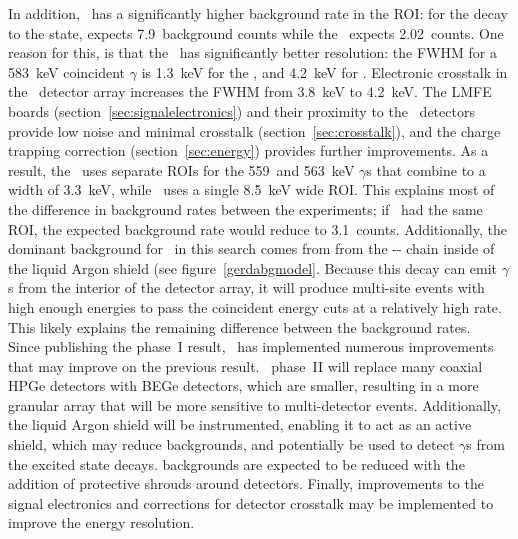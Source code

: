 \documentclass[/main.tex]{subfiles}
\begin{document}
In addition, \Gerda\ has a significantly higher background rate in the ROI: for the decay to the  state, \Gerda expects 7.9~background counts while the \MJD\ expects 2.02~counts.
One reason for this, is that the \MJD\ has significantly better resolution: the FWHM for a  583~keV coincident $\gamma$ is 1.3~keV for the \MJD, and 4.2~keV for \Gerda.
Electronic crosstalk in the \Gerda\ detector array increases the FWHM from 3.8~keV to 4.2~keV.
The LMFE boards (section~\ref{sec:signalelectronics}) and their proximity to the \MJ\ detectors provide low noise and minimal crosstalk (section~\ref{sec:crosstalk}), and the charge trapping correction (section~\ref{sec:energy}) provides further improvements.
As a result, the \MJD\ uses separate ROIs for the 559~and 563~keV $\gamma$s that combine to a width of 3.3~keV, while \Gerda\ uses a single 8.5~keV wide ROI.
This explains most of the difference in background rates between the experiments; if \Gerda\ had the same ROI, the expected background rate would reduce to 3.1~counts.
Additionally, the dominant background for \Gerda\ in this search comes from  from the -- chain inside of the liquid Argon shield (see figure~\ref{gerdabgmodel}.
Because this decay can emit $\gamma$s from the interior of the detector array, it will produce multi-site events with high enough energies to pass the coincident energy cuts at a relatively high rate.
This likely explains the remaining difference between the background rates.
\\
Since publishing the phase~I result\cite{gerdaESresult}, \Gerda\ has implemented numerous improvements that may improve on the previous result\cite{gerda2018}.
\Gerda\ phase~II will replace many coaxial HPGe detectors with BEGe detectors, which are smaller, resulting in a more granular array that will be more sensitive to multi-detector events.
Additionally, the liquid Argon shield will be instrumented, enabling it to act as an active shield, which may reduce backgrounds, and potentially be used to detect $\gamma$s from the excited state decays.
 backgrounds are expected to be reduced with the addition of protective shrouds around detectors.
Finally, improvements to the signal electronics and corrections for detector crosstalk may be implemented to improve the energy resolution.
\\
\end{document}
